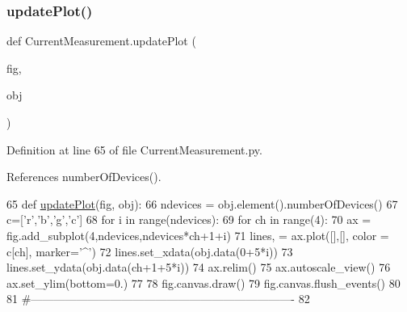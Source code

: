 \subsubsection{\texorpdfstring{update\+Plot()}{updatePlot()}}
{\footnotesize\ttfamily def Current\+Measurement.\+update\+Plot (\begin{DoxyParamCaption}\item[{}]{fig,  }\item[{}]{obj }\end{DoxyParamCaption})}



Definition at line 65 of file Current\+Measurement.\+py.



References number\+Of\+Devices().


\begin{DoxyCode}
65 \textcolor{keyword}{def }\hyperlink{namespaceCurrentMeasurement_a7de64b4b34fccae5633afcb56d04363f}{updatePlot}(fig, obj):
66     ndevices = obj.element().numberOfDevices()
67     c=[\textcolor{stringliteral}{'r','}b','g','c']
68     \textcolor{keywordflow}{for} i \textcolor{keywordflow}{in} range(ndevices):
69         \textcolor{keywordflow}{for} ch \textcolor{keywordflow}{in} range(4):
70             ax = fig.add\_subplot(4,ndevices,ndevices*ch+1+i)
71             lines, = ax.plot([],[], color = c[ch], marker=\textcolor{stringliteral}{'^'})
72             lines.set\_xdata(obj.data(0+5*i))
73             lines.set\_ydata(obj.data(ch+1+5*i))
74             ax.relim()
75             ax.autoscale\_view()
76             ax.set\_ylim(bottom=0.)
77 
78     fig.canvas.draw()
79     fig.canvas.flush\_events()
80 
81 \textcolor{comment}{#----------------------------------------------------------------------}
82 \end{DoxyCode}
